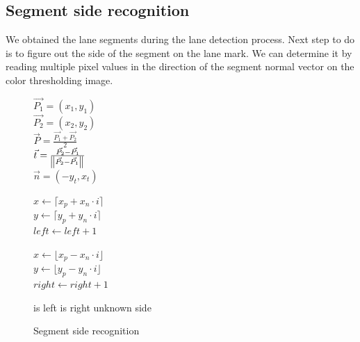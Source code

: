 \documentclass{article}
\begin{document}
\subsection{Segment side recognition}
We obtained the lane segments during the lane detection process. Next step to do is to figure out the side of the segment on the lane mark. We can determine it by reading multiple pixel values in the direction of the segment normal vector on the color thresholding image.
\begin{figure} [ht]
\begin{algorithm}[H]
	$\vec{P_1} = (x_1, y_1)$
	\\
	$\vec{P_2} = (x_2, y_2)$
	\\
	$\vec{P} = \frac{\vec{P_1} + \vec{P_2}}{2}$
	\\
	$\vec{t} = \frac{\vec{P_2} - \vec{P_1}}
					{\norm{\vec{P_2} - \vec{P_1}}}$
	\\
	$\vec{n} = (-y_t, x_t)$
	\\
	 {
		$x \gets \lceil x_p + x_n \cdot i \rceil$
		\\
		$y \gets \lceil y_p + y_n \cdot i \rceil$
		\\		
			{
				$left \gets left + 1$ 
			}
			
		$x \gets \lfloor x_p - x_n \cdot i \rfloor$
		\\
		$y \gets \lfloor y_p - y_n \cdot i \rfloor$
		\\		
			{
				$right \gets right + 1$ 
			}
	}
	
		{
			\Return is left
		}
		{
			\Return is right
		}
	\uElse
		{
			\Return unknown side
		} 
	\caption{Segment side recognition}
\end{algorithm}
\end{figure}
\end{document}
